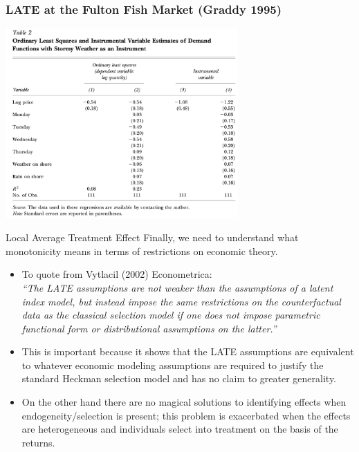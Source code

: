 \documentclass[xcolor=pdftex,dvipsnames,table,mathserif,aspectratio=169]{beamer}
\begin{document}
\begin{frame}
\frametitle{LATE at the Fulton Fish Market (Graddy 1995)}

\begin{center}
\includegraphics[width=3.5in]{./resources/graddy}
\end{center}

\end{frame}





\begin{frame}{Local Average Treatment Effect}
Finally, we need to understand what monotonicity means in terms of restrictions on economic theory. 
\begin{itemize}
\item To quote from Vytlacil (2002) Econometrica:\\
\emph{ ``The LATE assumptions are not weaker than the assumptions of a latent index model, but instead impose the same restrictions on the counterfactual data as the classical selection model if one does not impose parametric functional form or distributional assumptions on the latter.''}
\item This is important because it shows that the LATE assumptions are equivalent to whatever economic modeling assumptions are required to justify the standard Heckman selection model and has no claim to greater generality.
\item On the other hand there are no magical solutions to identifying effects when endogeneity/selection is present; this problem is exacerbated when the effects are heterogeneous and individuals select into treatment on the basis of the returns.
\end{itemize}
\end{frame}
\end{document}
